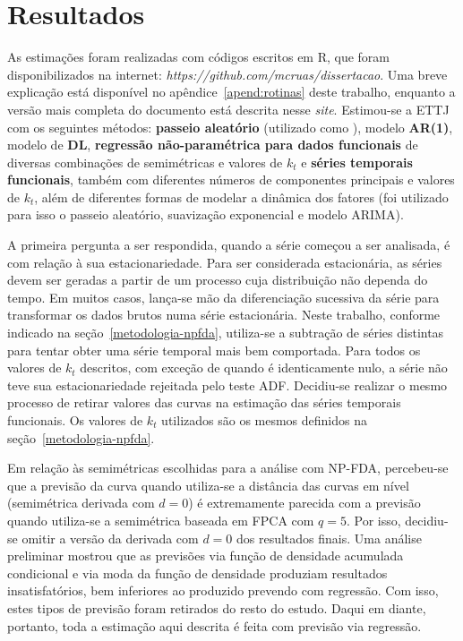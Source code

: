 \documentclass[
	12pt,				%
	openright,			%
	oneside,			%
	a4paper,			%
	english,			%
	brazil				%
	]{dissertacao-ufrgs-abntex2}
\begin{document}
\chapter{Resultados} \label{ch:resultados}

As estimações foram realizadas com códigos escritos em R, que foram disponibilizados na internet: \emph{https://github.com/mcruas/dissertacao}. Uma breve  explicação está 
disponível no apêndice~\ref{apend:rotinas} deste trabalho, enquanto a versão mais completa do documento está descrita nesse \emph{site}. 
Estimou-se a ETTJ com os seguintes métodos: \textbf{passeio aleatório} (utilizado como \bm ), modelo \textbf{AR(1)}, modelo de \textbf{DL}, \textbf{regressão não-paramétrica para dados funcionais} de diversas combinações de semimétricas e valores de $k_t$ e \textbf{séries temporais funcionais}, também com diferentes números de componentes principais e valores de $k_t$, além de diferentes formas de modelar a dinâmica dos fatores (foi utilizado para isso o passeio aleatório, suavização exponencial e modelo ARIMA).

A primeira pergunta a ser respondida, quando a série começou a ser analisada, é com relação à sua estacionariedade. Para ser considerada estacionária, as séries devem ser geradas a partir de um processo cuja distribuição não dependa do tempo. Em muitos casos, lança-se mão da diferenciação sucessiva da série para transformar os dados brutos numa série estacionária. Neste trabalho, conforme indicado na seção~\ref{metodologia-npfda}, utiliza-se a subtração de séries distintas para tentar obter uma série temporal mais bem comportada. Para todos os valores de $k_t$ descritos, com exceção de quando é identicamente nulo, a série não teve sua estacionariedade rejeitada pelo teste ADF. Decidiu-se realizar o mesmo processo de retirar valores das curvas na estimação das séries temporais funcionais. Os valores de $k_t$ utilizados são os mesmos definidos na seção~\ref{metodologia-npfda}.

Em relação às semimétricas escolhidas para a análise com NP-FDA, percebeu-se que a previsão da curva quando utiliza-se a distância das curvas em nível (semimétrica derivada com $d=0$) é extremamente parecida com a previsão quando utiliza-se a semimétrica baseada em FPCA com $q=5$. Por isso, decidiu-se omitir a versão da derivada com $d=0$ dos resultados finais.
Uma análise preliminar mostrou que as previsões via função de densidade acumulada condicional e via moda da função de densidade produziam resultados insatisfatórios, bem inferiores ao produzido prevendo com regressão. Com isso, estes tipos de previsão foram retirados do resto do estudo. Daqui em diante, portanto, toda a estimação aqui descrita é feita com previsão via regressão.
\end{document}
